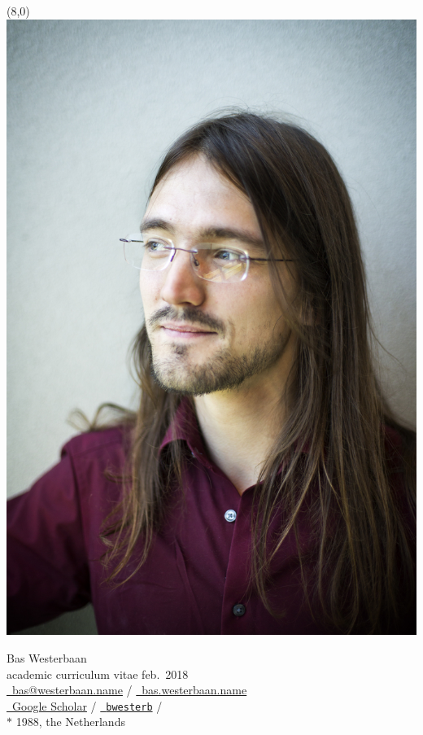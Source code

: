 \documentclass{article}
\newcommand\hsep{ {\color{gray}/} }
\begin{document}
\begin{textblock}{2}(8,0)
\includegraphics[width=\textwidth]{me}
\end{textblock}\noindent
\textsf{\Large Bas Westerbaan}\\
academic curriculum vitae feb.~2018\\

\noindent
\href{mailto:bas@westerbaan.name}{\faEnvelopeO\ bas@westerbaan.name} \hsep
\href{https://bas.westerbaan.name}{\faExternalLink\ bas.westerbaan.name}\\
\href{https://scholar.google.nl/citations?user=AN7BEa8AAAAJ}{%
    \faGraduationCap\ Google Scholar}
    \hsep \href{https://github.com/bwesterb}{\faGithub\ \texttt{bwesterb}}
    \hsep \href{https://www.linkedin.com/in/baswesterbaan/}{\faLinkedinSquare} \\
$*$ 1988, the Netherlands
\end{document}
